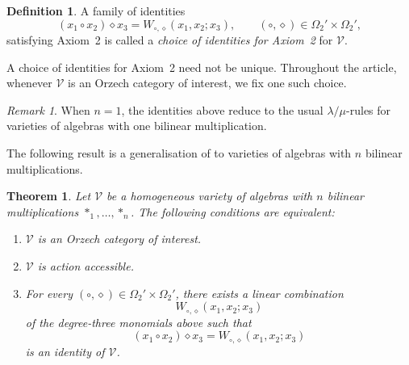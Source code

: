 \documentclass[reqno,a4paper]{amsart}
\theoremstyle{plain}
\newtheorem{theorem}[subsection]{Theorem}
\theoremstyle{definition}
\newtheorem{definition}[subsection]{Definition}
\theoremstyle{remark}
\newtheorem{remark}[subsection]{Remark}
\numberwithin{equation}{section}
\newenvironment{tfae}
{\renewcommand{\labelenumi}{(\roman{enumi})}
\begin{enumerate}}
{\end{enumerate}}
\newcommand{\V}{\mathcal{V}}
\begin{document}
\begin{definition}
A family of identities
\[
(x_1\circ x_2)\diamond x_3
=
W_{\circ,\diamond}(x_1,x_2;x_3),
\qquad
(\circ,\diamond)\in\Omega_2'\times\Omega_2',
\]
satisfying Axiom~2 is called a \emph{choice of identities for Axiom~2} for $\V$.
\end{definition}

A choice of identities for Axiom~2 need not be unique. Throughout the article, whenever $\V$ is an Orzech category of interest, we fix one such choice.

\begin{remark}
When $n=1$, the identities above reduce to the usual $\lambda/\mu$-rules for varieties of algebras with one bilinear multiplication.
\end{remark}

The following result is a generalisation of  to varieties of algebras with $n$ bilinear multiplications.

\begin{theorem}\label{ThmActionAccessibilityNOperations}
Let $\V$ be a homogeneous variety of algebras with $n$ bilinear multiplications $\ast_1,\ldots,\ast_n$. The following conditions are equivalent:
\begin{tfae}
\item $\V$ is an Orzech category of interest.
\item $\V$ is action accessible.
\item For every $(\circ,\diamond)\in\Omega_2'\times\Omega_2'$, there exists a linear combination
\[
W_{\circ,\diamond}(x_1,x_2;x_3)
\]
of the degree-three monomials above such that
\[
(x_1\mathbin{\circ}x_2)\mathbin{\diamond}x_3
=
W_{\circ,\diamond}(x_1,x_2;x_3)
\]
is an identity of $\V$.
\end{tfae}
\end{theorem}
\end{document}
